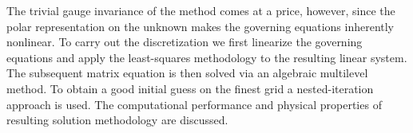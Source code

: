 \documentclass{report}
\begin{document}
The trivial gauge invariance of the method comes at a price, however,
since the polar representation on the unknown makes the governing
equations inherently nonlinear. To carry out the discretization we first
linearize the governing equations and apply the least-squares methodology
to the resulting linear system. The subsequent matrix equation is then
solved via an algebraic multilevel method. To obtain a good initial guess
on the finest grid a nested-iteration approach is used. The computational
performance and physical properties of resulting solution methodology are
discussed.
\end{document}
